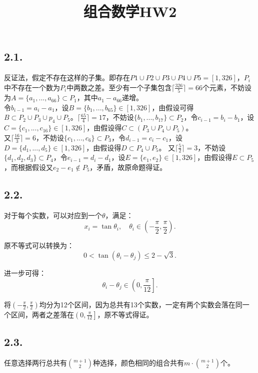 \documentclass{article}
\title{组合数学HW2}
\begin{document}
\maketitle

\subsection*{2.1.}

反证法，假定不存在这样的子集。即存在$P1\cup P2\cup P3 \cup P4\cup P5=[1,326]$，$P_i$中不存在一个数为$P_i$中两数之差。至少有一个子集包含$\lceil\frac{326}{5}\rceil=66$个元素，不妨设为$A=\{a_1, ..., a_{66}\}\subset P_1$，其中$a_1-a_{66}$递增。\\
令$b_{i-1}=a_i-a_1$，设$B=\{b_1,...,b_{65}\}\in[1,326]$，由假设可得$B\subset P_2\cup P_3\cup p_4\cup P_5$。$\lceil\frac{65}{4}\rceil=17$，不妨设$\{b_1,...,b_{17}\}\subset P_2$，令$c_{i-1}=b_i-b_1$，设$C=\{c_1,...,c_{16}\}\in [1,326]$，由假设得$C\subset (P_3\cup P_4\cup P_5)$。 \\
又$\lceil\frac{16}{3}\rceil=6$，不妨设$\{c_1,...,c_{6}\}\subset P_3$，令$d_{i-1}=c_i-c_1$，设$D=\{d_1,...,d_5\}\in [1,326]$，由假设得$D\subset P_4\cup P_5$。
又$\lceil\frac{5}{2}\rceil=3$，不妨设$\{d_1,d_2,d_3\}\subset P_4$，令$e_{i-1}=d_i-d_1$，设$E=\{e_1,e_2\}\in [1,326]$，由假设得$E\subset P_5$，而根据假设又$e_2-e_1\notin P_5$，矛盾，故原命题得证。

\subsection*{2.2.}

对于每个实数，可以对应到一个$\theta$，满足：
\[
x_i = \tan \theta_i, \quad \theta_i \in \left(-\frac{\pi}{2}, \frac{\pi}{2}\right).
\]

原不等式可以转换为：
\[
0 < \tan(\theta_i - \theta_j) \leq 2 - \sqrt{3}.
\]

进一步可得：
\[
\theta_i - \theta_j \in \left(0, \frac{\pi}{12}\right].
\]

将$\left(-\frac{\pi}{2}, \frac{\pi}{2}\right)$均分为12个区间，因为总共有13个实数，一定有两个实数会落在同一个区间，两者之差落在$\left(0, \frac{\pi}{12}\right]$，原不等式得证。

\subsection*{2.3.}

任意选择两行总共有$\binom{m+1}{2}$种选择，颜色相同的组合共有$m\cdot \binom{m+1}{2}$个。
\end{document}
